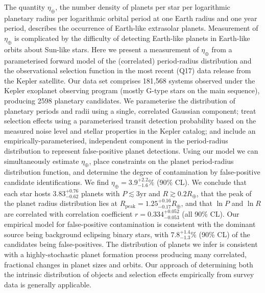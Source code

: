 \documentclass[12pt]{article}
\newcommand{\etaearth}{\eta_\oplus}
\newcommand{\Rpeak}{R_\mathrm{peak}}
\newcommand{\REarth}{R_\oplus}
\newcommand{\earange}{3.9_{-1.6}^{+2.2}\%}
\newcommand{\rplrange}{3.83_{-0.62}^{+0.76}}
\newcommand{\rpeakrange}{1.25_{-0.17}^{+0.16}}
\newcommand{\corrcoeffrange}{0.334_{-0.053}^{+0.052}}
\newcommand{\fposrange}{7.8_{-1.3}^{+1.4}\%}
\begin{document}
The quantity $\etaearth$, the number density of planets per star per
logarithmic planetary radius per logarithmic orbital period at one
Earth radius and one year period, describes the occurrence of
Earth-like extrasolar planets.  Measurement of $\etaearth$ is
complicated by the difficulty of detecting Earth-like planets in
Earth-like orbits about Sun-like stars.  Here we present a measurement
of $\etaearth$ from a parameterised forward model of the (correlated)
period-radius distribution and the observational selection function in
the most recent (Q17) data release from the Kepler
satellite\cite{Borucki2010,Borucki2011,Batalha2013}.  Our data set
comprises 181,568 systems observed under the Kepler exoplanet
observing program (mostly G-type stars on the main
sequence\cite{Batalha2010}), producing 2598 planetary candidates.  We
parameterise the distribution of planetary periods and radii using a
single, correlated Gaussian component; treat selection effects using a
parameterised transit detection probability based on the measured
noise level and stellar properties in the Kepler catalog; and include
an empirically-parameterised, independent component in the
period-radius distribution to represent false-positive planet
detections.  Using our model we can simultaneously estimate
$\etaearth$, place constraints on the planet period-radius
distribution function, and determine the degree of contamination by
false-positive candidate identifications.  We find $\etaearth =
\earange$ (90\% CL).  We conclude that each star hosts $\rplrange$
planets with $P \lesssim 3 \mathrm{yr}$ and $R \gtrsim 0.2 \REarth$,
that the peak of the planet radius distribution lies at $\Rpeak =
\rpeakrange \REarth$, and that $\ln P$ and $\ln R$ are correlated with
correlation coefficient $r = \corrcoeffrange$ (all 90\% CL).  Our
empirical model for false-positive contamination is consistent with
the dominant source being background eclipsing binary
stars\cite{Fressin2013}, with $\fposrange$ (90\% CL) of the candidates
being false-positives.  The distribution of planets we infer is
consistent with a highly-stochastic planet formation process producing
many correlated, fractional changes in planet sizes and orbits.  Our
approach of determining both the intrinsic distribution of objects and
selection effects empirically from survey data is generally
applicable.
\end{document}
